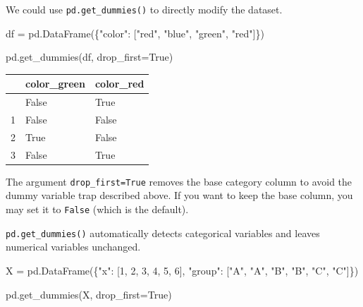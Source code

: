 \documentclass[
  letterpaper,
  DIV=11,
  numbers=noendperiod]{scrreprt}
\newenvironment{Shaded}{\begin{snugshade}}{\end{snugshade}}
\newcommand{\DecValTok}[1]{\textcolor[rgb]{0.68,0.00,0.00}{#1}}
\newcommand{\NormalTok}[1]{\textcolor[rgb]{0.00,0.23,0.31}{#1}}
\newcommand{\OperatorTok}[1]{\textcolor[rgb]{0.37,0.37,0.37}{#1}}
\newcommand{\StringTok}[1]{\textcolor[rgb]{0.13,0.47,0.30}{#1}}
\newcommand{\VariableTok}[1]{\textcolor[rgb]{0.07,0.07,0.07}{#1}}
\newcounter{none} %
\theoremstyle{definition}
\theoremstyle{definition}
\theoremstyle{plain}
\theoremstyle{plain}
\theoremstyle{remark}
\begin{document}
We could use \texttt{pd.get\_dummies()} to directly modify the dataset.

\begin{Shaded}
\begin{Highlighting}[]
\NormalTok{df }\OperatorTok{=}\NormalTok{ pd.DataFrame(\{}\StringTok{"color"}\NormalTok{: [}\StringTok{"red"}\NormalTok{, }\StringTok{"blue"}\NormalTok{, }\StringTok{"green"}\NormalTok{, }\StringTok{"red"}\NormalTok{]\})}

\NormalTok{pd.get\_dummies(df, drop\_first}\OperatorTok{=}\VariableTok{True}\NormalTok{)}
\end{Highlighting}
\end{Shaded}

{\def\LTcaptype{none} %
\begin{longtable}[]{@{}lll@{}}
\toprule\noalign{}
& color\_green & color\_red \\
\midrule\noalign{}
\endhead
\bottomrule\noalign{}
\endlastfoot
0 & False & True \\
1 & False & False \\
2 & True & False \\
3 & False & True \\
\end{longtable}
}

The argument \texttt{drop\_first=True} removes the base category column
to avoid the dummy variable trap described above. If you want to keep
the base column, you may set it to \texttt{False} (which is the
default).

\texttt{pd.get\_dummies()} automatically detects categorical variables
and leaves numerical variables unchanged.

\begin{Shaded}
\begin{Highlighting}[]
\NormalTok{X }\OperatorTok{=}\NormalTok{ pd.DataFrame(\{}\StringTok{"x"}\NormalTok{: [}\DecValTok{1}\NormalTok{, }\DecValTok{2}\NormalTok{, }\DecValTok{3}\NormalTok{, }\DecValTok{4}\NormalTok{, }\DecValTok{5}\NormalTok{, }\DecValTok{6}\NormalTok{], }\StringTok{"group"}\NormalTok{: [}\StringTok{"A"}\NormalTok{, }\StringTok{"A"}\NormalTok{, }\StringTok{"B"}\NormalTok{, }\StringTok{"B"}\NormalTok{, }\StringTok{"C"}\NormalTok{, }\StringTok{"C"}\NormalTok{]\})}

\NormalTok{pd.get\_dummies(X, drop\_first}\OperatorTok{=}\VariableTok{True}\NormalTok{)}
\end{Highlighting}
\end{Shaded}
\end{document}
